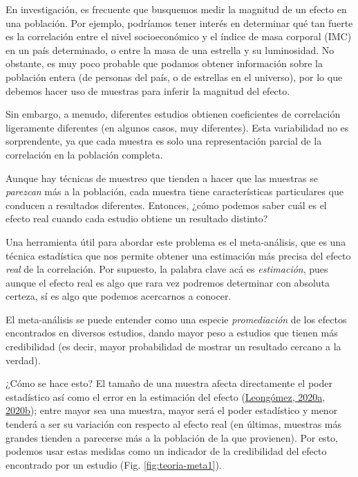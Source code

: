 \documentclass[
  bookmarksnumbered]{article}
\begin{document}
En investigación, es frecuente que busquemos medir la magnitud de un efecto en una población. Por ejemplo, podríamos tener interés en determinar qué tan fuerte es la correlación entre el nivel socioeconómico y el índice de masa corporal (IMC) en un país determinado, o entre la masa de una estrella y su luminosidad. No obstante, es muy poco probable que podamos obtener información sobre la población entera (de personas del país, o de estrellas en el universo), por lo que debemos hacer uso de muestras para inferir la magnitud del efecto.

Sin embargo, a menudo, diferentes estudios obtienen coeficientes de correlación ligeramente diferentes (en algunos casos, muy diferentes). Esta variabilidad no es sorprendente, ya que cada muestra es solo una representación parcial de la correlación en la población completa.

Aunque hay técnicas de muestreo que tienden a hacer que las muestras se \emph{parezcan} más a la población, cada muestra tiene características particulares que conducen a resultados diferentes. Entonces, ¿cómo podemos saber cuál es el efecto real cuando cada estudio obtiene un resultado distinto?

Una herramienta útil para abordar este problema es el meta-análisis, que es una técnica estadística que nos permite obtener una estimación más precisa del efecto \emph{real} de la correlación. Por supuesto, la palabra clave acá es \emph{estimación}, pues aunque el efecto real es algo que rara vez podremos determinar con absoluta certeza, sí es algo que podemos acercarnos a conocer.

El meta-análisis se puede entender como una especie \emph{promediación} de los efectos encontrados en diversos estudios, dando mayor peso a estudios que tienen más credibilidad (es decir, mayor probabilidad de mostrar un resultado cercano a la verdad).

¿Cómo se hace esto? El tamaño de una muestra afecta directamente el poder estadístico así como el error en la estimación del efecto (\protect\hyperlink{ref-leongomezAnalisisPoderEstadistico2020}{Leongómez, 2020a}, \protect\hyperlink{ref-leongomezPoderRvid2020}{2020b}); entre mayor sea una muestra, mayor será el poder estadístico y menor tenderá a ser su variación con respecto al efecto real (en últimas, muestras más grandes tienden a parecerse más a la población de la que provienen). Por esto, podemos usar estas medidas como un indicador de la credibilidad del efecto encontrado por un estudio (Fig. \ref{fig:teoria-meta1}).
\end{document}
